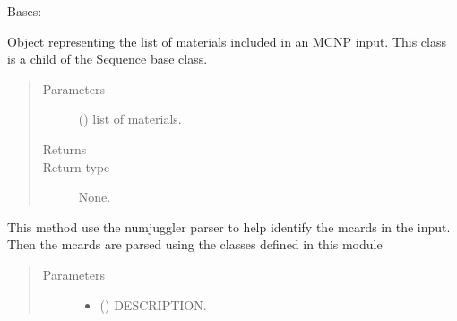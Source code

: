 \documentclass[letterpaper,10pt,english]{sphinxmanual}
\begin{document}
\begin{fulllineitems}
\label{\detokenize{api/inputgeneration:matreader.MatCardsList}}
\sphinxAtStartPar
Bases: 

\sphinxAtStartPar
Object representing the list of materials included in an MCNP input.
This class is a child of the Sequence base class.
\begin{quote}\begin{description}
\item[{Parameters}] \leavevmode
\sphinxAtStartPar
{} (\sphinxstyleliteralemphasis{\sphinxupquote{{[}}}{\hyperref[\detokenize{api/inputgeneration:matreader.Material}]{\sphinxcrossref{\sphinxstyleliteralemphasis{\sphinxupquote{Material}}}}}\sphinxstyleliteralemphasis{\sphinxupquote{{]}}}) \textendash{} list of materials.

\item[{Returns}] \leavevmode
\sphinxAtStartPar


\item[{Return type}] \leavevmode
\sphinxAtStartPar
None.

\end{description}\end{quote}

\begin{fulllineitems}
\label{\detokenize{api/inputgeneration:matreader.MatCardsList.from_input}}
\sphinxAtStartPar
This method use the numjuggler parser to help identify the mcards in
the input. Then the mcards are parsed using the classes defined in this
module
\begin{quote}\begin{description}
\item[{Parameters}] \leavevmode\begin{itemize}
\item {} 
\sphinxAtStartPar
{} () \textendash{} DESCRIPTION.


\end{itemize}
\end{description}
\end{quote}
\end{fulllineitems}
\end{fulllineitems}
\end{document}
